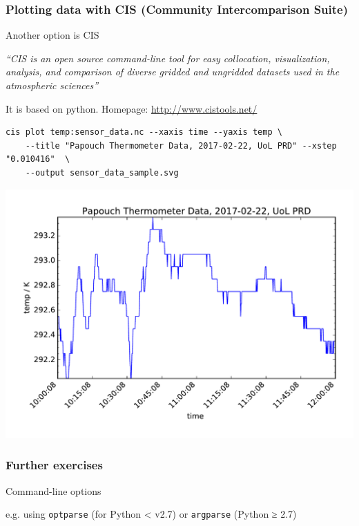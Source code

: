 \documentclass[aspectratio=1610,9pt]{beamer} %
\begin{document}
\begin{frame}[fragile]
\frametitle{Plotting data with CIS (Community Intercomparison
Suite)}

Another option is CIS

\emph{``CIS is an open source command-line tool for easy collocation,
visualization, analysis, and comparison of diverse gridded and ungridded
datasets used in the atmospheric sciences''}

It is based on python. Homepage:
\url{http://www.cistools.net/}

\begin{verbatim}
cis plot temp:sensor_data.nc --xaxis time --yaxis temp \ 
    --title "Papouch Thermometer Data, 2017-02-22, UoL PRD" --xstep "0.010416"  \ 
    --output sensor_data_sample.svg
\end{verbatim}
\end{frame}
\begin{frame}

\includegraphics[width=\textwidth]{sensor_data_sample}

\end{frame}
\begin{frame}
\frametitle{Further exercises}

\begin{block}{Command-line options}

e.g. using \texttt{optparse} (for Python \textless{} v2.7) or
\texttt{argparse} (Python ≥ 2.7)
\end{block}
\end{frame}
\end{document}
